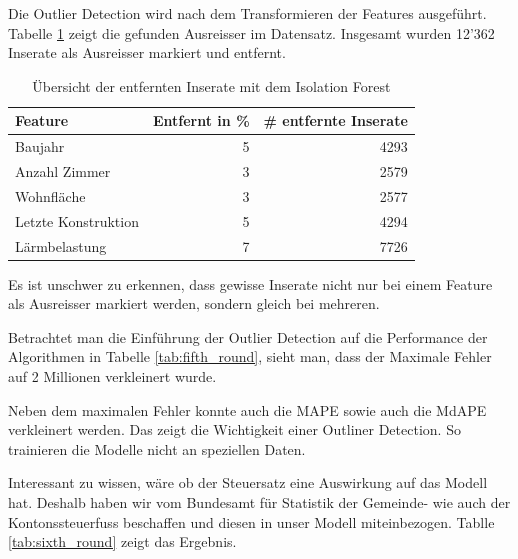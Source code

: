 Die Outlier Detection wird nach dem Transformieren der Features ausgeführt. Tabelle \ref{tab:iso_forest} zeigt die gefunden Ausreisser im Datensatz. Insgesamt wurden 12'362 Inserate als Ausreisser markiert und entfernt.

\begin{table}[ht]
\centering
{}
\begin{tabular}{@{}lrr@{}}
\toprule
Feature & Entfernt in \% & \# entfernte Inserate\\
\midrule
Baujahr & 5 & 4293\\
Anzahl Zimmer & 3 & 2579\\
Wohnfläche & 3 & 2577\\
Letzte Konstruktion & 5 & 4294\\
Lärmbelastung & 7 & 7726\\
\bottomrule
\end{tabular}
\caption{Übersicht der entfernten Inserate mit dem Isolation Forest}
\label{tab:iso_forest}
\end{table}

Es ist unschwer zu erkennen, dass gewisse Inserate nicht nur bei einem Feature als Ausreisser markiert werden, sondern gleich bei mehreren.

Betrachtet man die Einführung der Outlier Detection auf die Performance der Algorithmen in Tabelle \ref{tab:fifth_round}, sieht man, dass der Maximale Fehler auf 2 Millionen verkleinert wurde.

\begin{table}[ht]
\centering
{}
\caption{Ergebnisse mit Einbezug einer Outlier Detection}
\label{tab:fifth_round}
\end{table}

Neben dem maximalen Fehler konnte auch die MAPE sowie auch die MdAPE verkleinert werden. Das zeigt die Wichtigkeit einer Outliner Detection. So trainieren die Modelle nicht an speziellen Daten.

Interessant zu wissen, wäre ob der Steuersatz eine Auswirkung auf das Modell hat. Deshalb haben wir vom Bundesamt für Statistik der Gemeinde- wie auch der Kontonssteuerfuss beschaffen und diesen in unser Modell miteinbezogen. Tablle \ref{tab:sixth_round} zeigt das Ergebnis.

